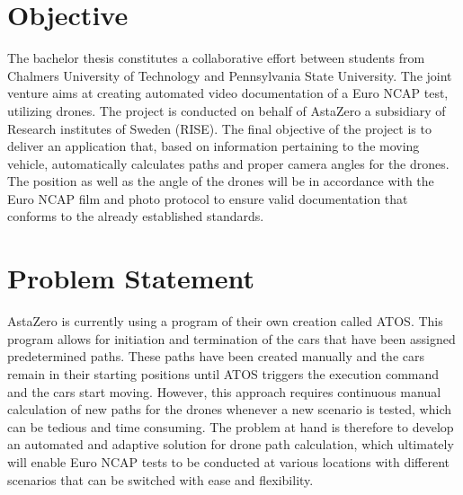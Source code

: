 \section{Objective} \label{Objective}

The bachelor thesis constitutes a collaborative effort between students from Chalmers University of Technology and Pennsylvania State University. The joint venture aims at creating automated video documentation of a Euro NCAP test, utilizing drones. The project is conducted on behalf of AstaZero a subsidiary of Research institutes of Sweden (RISE). The final objective of the project is to deliver an application that, based on information pertaining to the moving vehicle, automatically calculates paths and proper camera angles for the drones. The position as well as the angle of the drones will be in accordance with the Euro NCAP film and photo protocol to ensure valid documentation that conforms to the already established standards. ~\cite{EuroNCAP2021EUROPEANPROTOCOL}
\bigskip
\newline 

\section{Problem Statement} \label{chap:problem statement}

AstaZero is currently using a program of their own creation called ATOS. This program allows for initiation and termination of the cars that have been assigned predetermined paths. These paths have been created manually and the cars remain in their starting positions until ATOS triggers the execution command and the cars start moving. However, this approach requires continuous manual calculation of new paths for the drones whenever a new scenario is tested, which can be tedious and time consuming. The problem at hand is therefore to develop an automated and adaptive solution for drone path calculation, which ultimately will enable Euro NCAP tests to be conducted at various locations with different scenarios that can be switched with ease and flexibility.
\bigskip
\newline

